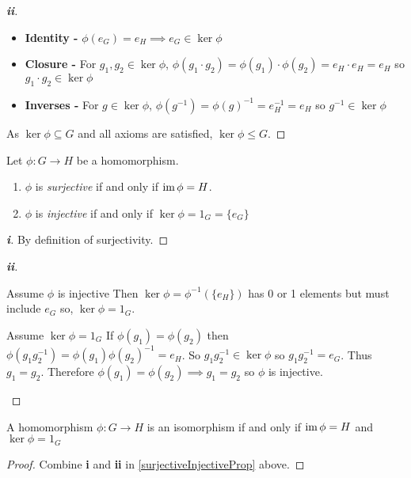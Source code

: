 \documentclass[../main.tex]{subfiles}
\begin{document}
\begin{proof}[\textbf{ii}]
  \begin{itemize}
    \item \textbf{Identity -} $\phi(e_G) = e_H \implies e_G \in \ker \phi$
    \item \textbf{Closure -} For $g_1, g_2 \in \ker \phi$, $\phi(g_1 \cdot g_2) = \phi(g_1) \cdot \phi(g_2) = e_H \cdot e_H = e_H$ so $g_1 \cdot g_2 \in \ker \phi$
    \item \textbf{Inverses -} For $g \in \ker \phi$, $\phi(g^{-1}) = \phi(g)^{-1} = e^{-1}_{H} = e_H$ so $g^{-1} \in \ker \phi$
  \end{itemize}
  As $\ker \phi \subseteq G$ and all axioms are satisfied, $\ker \phi \leq G$.
\end{proof}
\begin{proposition}
  \label{surjectiveInjectiveProp}
  Let $\phi: G \to H$ be a homomorphism.
  \begin{enumerate}
    \item $\phi$ is \textit{surjective} if and only if $\operatorname{im} \phi = H$.
    \item $\phi$ is \textit{injective} if and only if $\ker \phi = 1_G = \{e_G\}$
  \end{enumerate}
\end{proposition}
\begin{proof}[\textbf{i}]
  By definition of surjectivity.
\end{proof}
\begin{proof}[\textbf{ii}]
  \begin{proofdirection}{Assume $\phi$ is injective}
    Then $\ker \phi = \phi^{-1}(\{e_H\})$ has 0 or 1 elements but must include $e_G$ so, $\ker \phi = 1_G$.
  \end{proofdirection}
  \begin{proofdirection}{Assume $\ker \phi = 1_G$}
    If $\phi(g_1) = \phi(g_2)$ then $\phi(g_1 g^{-1}_{2}) = \phi(g_1)\phi(g_2)^{-1} = e_H$.
    So $g_1 g^{-1}_{2} \in \ker \phi$ so $g_1 g^{-1}_{2} = e_G$.
    Thus $g_1 = g_2$.
    Therefore $\phi(g_1) = \phi(g_2) \implies g_1 = g_2$ so $\phi$ is injective.
  \end{proofdirection}
\end{proof}
\begin{proposition}
  A homomorphism $\phi: G \to H$ is an isomorphism if and only if $\operatorname{im} \phi = H$ and $\ker \phi = 1_G$
\end{proposition}
\begin{proof}
  Combine \textbf{i} and \textbf{ii} in \cref{surjectiveInjectiveProp} above.
\end{proof}
\end{document}
